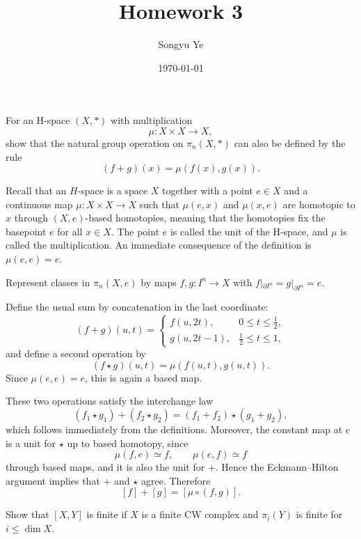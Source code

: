 \documentclass[12pt]{article}
\title{Homework 3}
\author{Songyu Ye}
\date{\today}
\begin{document}
\psettitle

\begin{problem}[1 (Hatcher AT, 4.1.3)]
For an H-space $(X,*)$ with multiplication
\[
\mu \colon X\times X \to X,
\]
show that the natural group operation on $\pi_n(X,*)$ can also be defined by the rule
\[
(f+g)(x)=\mu(f(x),g(x)).
\]

Recall that an $H$-space is a space $X$ together with a point $e\in X$ and a continuous map $\mu\colon X\times X\to X$ such that $\mu(e,x)$ and $\mu(x,e)$ are homotopic to $x$ through $(X,e)$-based homotopies, meaning that the homotopies fix the basepoint $e$ for all $x\in X$. The point $e$ is called the unit of the H-space, and $\mu$ is called the multiplication. An immediate consequence of the definition is $\mu(e,e) = e$.
\end{problem}

\begin{solution}
Represent classes in $\pi_n(X,e)$ by maps $f,g:I^n\to X$ with $f|_{\partial I^n}=g|_{\partial I^n}=e$.

Define the usual sum by concatenation in the last coordinate:
\[
(f+g)(u,t)=
\begin{cases}
f(u,2t), & 0\le t\le \tfrac12,\\
g(u,2t-1), & \tfrac12\le t\le 1,
\end{cases}
\]
and define a second operation by
\[
(f\star g)(u,t)=\mu(f(u,t),g(u,t)).
\]
Since $\mu(e,e)=e$, this is again a based map.

These two operations satisfy the interchange law
\[
(f_1\star g_1)+(f_2\star g_2)=(f_1+f_2)\star(g_1+g_2),
\]
which follows immediately from the definitions.
Moreover, the constant map at $e$ is a unit for $\star$ up to based homotopy, since
\[
\mu(f,e)\simeq f,\qquad \mu(e,f)\simeq f
\]
through based maps, and it is also the unit for $+$.
Hence the Eckmann--Hilton argument implies that $+$ and $\star$ agree.
Therefore
\[
[f]+[g]=[\mu\circ(f,g)].
\]
\end{solution}

\begin{problem}[2 (Hatcher, 4.1.20)]
Show that $[X,Y]$ is finite if $X$ is a finite CW complex and $\pi_i(Y)$ is finite for $i\le \dim X$.
\end{problem}
\end{document}
